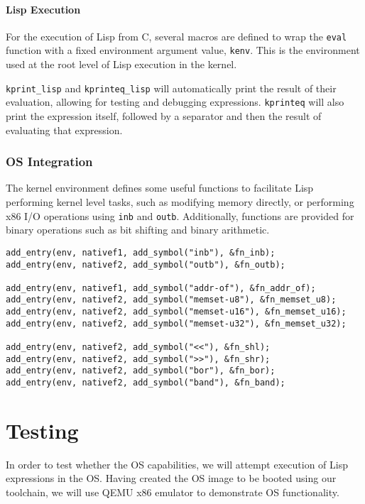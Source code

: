 \documentclass[10pt]{report}
\begin{document}
\subsubsection{Lisp Execution}
For the execution of Lisp from C, several macros are defined to wrap the \texttt{eval} function with a fixed environment argument value, \texttt{kenv}. This is the environment used at the root level of Lisp execution in the kernel.



\texttt{kprint_lisp} and \texttt{kprinteq_lisp} will automatically print the result of their evaluation, allowing for testing and debugging expressions. \texttt{kprinteq} will also print the expression itself, followed by a separator and then the result of evaluating that expression.

\subsection{OS Integration}
The kernel environment defines some useful functions to facilitate Lisp performing kernel level tasks, such as modifying memory directly, or performing x86 I/O operations using \texttt{inb} and \texttt{outb}. Additionally, functions are provided for binary operations such as bit shifting and binary arithmetic.

\begin{lstlisting}
add_entry(env, nativef1, add_symbol("inb"), &fn_inb);
add_entry(env, nativef2, add_symbol("outb"), &fn_outb);

add_entry(env, nativef1, add_symbol("addr-of"), &fn_addr_of);
add_entry(env, nativef2, add_symbol("memset-u8"), &fn_memset_u8);
add_entry(env, nativef2, add_symbol("memset-u16"), &fn_memset_u16);
add_entry(env, nativef2, add_symbol("memset-u32"), &fn_memset_u32);

add_entry(env, nativef2, add_symbol("<<"), &fn_shl);
add_entry(env, nativef2, add_symbol(">>"), &fn_shr);
add_entry(env, nativef2, add_symbol("bor"), &fn_bor);
add_entry(env, nativef2, add_symbol("band"), &fn_band);
\end{lstlisting}

\chapter{Testing}
In order to test whether the OS capabilities, we will attempt execution of Lisp expressions in the OS. Having created the OS image to be booted using our toolchain, we will use QEMU x86 emulator to demonstrate OS functionality.
\end{document}
